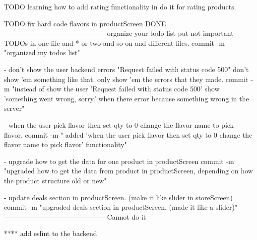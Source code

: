 

TODO learning how to add rating functionality in do it for rating products.

TODO fix hard code flavors in productScreen
DONE
--------------------------------------------
organize your todo list put not important TODOs in one file and * or two and so on and different files.
    commit -m "organized my todos list"

- don't show the user backend errors "Request failed with 
    status code 500" don't show 'em something like that. only 
    show 'em the errors that they made.
    commit -m "instead of show the user 'Request failed with status code 500' show 'something went wrong, sorry.' when there error because something wrong in the server"

- when the user pick flavor then set qty to 0 change the flavor name to pick flavor.
    commit -m " added 'when the user pick flavor then set qty to 0 change the flavor name to pick flavor' functionality"

- upgrade how to get the data for one product in productScreen
    commit -m "upgraded how to get the data from product in productScreen, depending on how the product structure old or new"

- update deals section in productScreen. (make it like slider in storeScreen)
    commit -m "upgraded deals section in productScreen. (made it like a slider)"
--------------------------------------------
Cannot do it

**** add eslint to the backend
